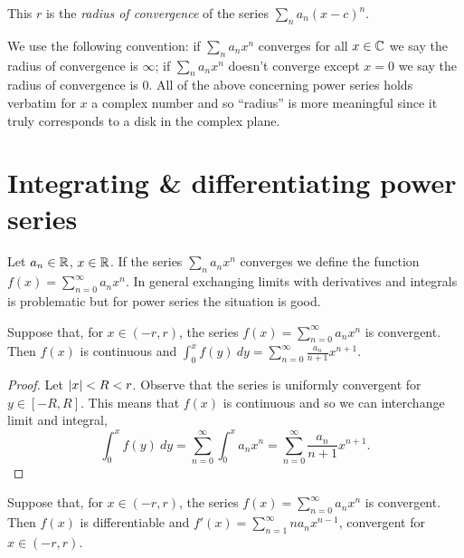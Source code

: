 \begin{definition}
  This \(r\) is the \emph{radius of convergence} of the series \(\sum_n a_n {(x-c)}^n\).
\end{definition}

We use the following convention:
if \(\sum_n a_n x^n\) converges for all \(x\in \mathbb{C}\) we say the radius of convergence is \(\infty\);
if \(\sum_n a_n x^n\) doesn't converge except  \(x=0\) we say the radius of convergence is \(0\).
All of the above concerning power series holds verbatim for \(x\) a complex number and so ``radius'' is more meaningful since it truly corresponds to a disk in the complex plane.




\section{Integrating \& differentiating power series}

Let \(a_n \in \mathbb{R}\), \(x\in \mathbb{R}\).
If the series \(\sum_n a_n x^n\) converges we define the function \(f(x) = \sum_{n=0}^{\infty} a_n x^n\).
In general exchanging limits with derivatives and integrals is problematic but for power series the situation is good.

\begin{theorem}%
  \label{thm:integrate-power}
  Suppose that, for \(x\in (-r,r)\), the series  \(f(x) = \sum_{n=0}^{\infty} a_n x^n\) is convergent.
  Then \(f(x)\) is continuous and \(\int_0^x f(y) \ dy = \sum_{n=0}^{\infty} \frac{a_n}{n+1} x^{n+1}\).
\end{theorem}

\begin{proof}
  Let \(\left|x\right|<R<r\).
  Observe that the series is uniformly convergent for \(y\in[-R,R]\).
  This means that \(f(x)\) is continuous and so we can interchange limit and integral,
  \[
    \int_0^x f(y) \ dy
    = \sum_{n=0}^{\infty} \int_0^x  {a_n} x^{n}
    = \sum_{n=0}^{\infty} \frac{a_n}{n+1} x^{n+1}.
  \]
\end{proof}

\begin{theorem}%
  \label{thm:differentiate-power}
  Suppose that, for \(x\in (-r,r)\), the series  \(f(x) = \sum_{n=0}^{\infty} a_n x^n\) is convergent.
  Then \(f(x)\) is differentiable and \(f'(x) =\sum_{n=1}^{\infty} n a_n x^{n-1}\), convergent for \(x\in (-r,r)\).
\end{theorem}

